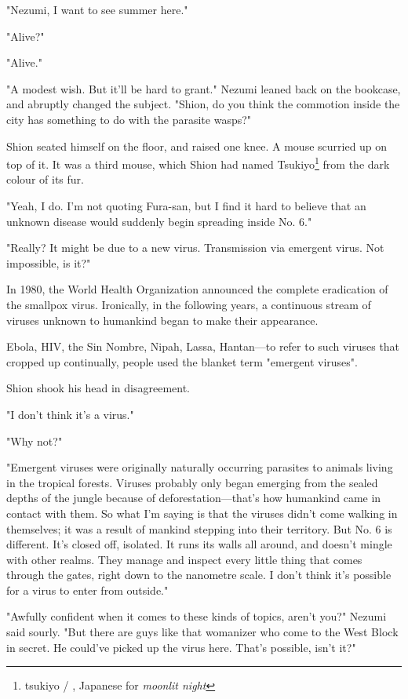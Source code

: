 "Nezumi, I want to see summer here."

"Alive?"

"Alive."

"A modest wish. But it'll be hard to grant." Nezumi leaned back on the
bookcase, and abruptly changed the subject. "Shion, do you think the
commotion inside the city has something to do with the parasite wasps?"

Shion seated himself on the floor, and raised one knee. A mouse scurried
up on top of it. It was a third mouse, which Shion had named Tsukiyo\footnote{tsukiyo / , Japanese for \emph{moonlit night}}
from the dark colour of its fur.

"Yeah, I do. I'm not quoting Fura-san, but I find it hard to believe
that an unknown disease would suddenly begin spreading inside No. 6."

"Really? It might be due to a new virus. Transmission via emergent
virus. Not impossible, is it?"

In 1980, the World Health Organization announced the complete
eradication of the smallpox virus. Ironically, in the following years, a
continuous stream of viruses unknown to humankind began to make their
appearance.

Ebola, HIV, the Sin Nombre, Nipah, Lassa, Hantan---to refer to such
viruses that cropped up continually, people used the blanket term
"emergent viruses".

Shion shook his head in disagreement.

"I don't think it's a virus."

"Why not?"

"Emergent viruses were originally naturally occurring parasites to
animals living in the tropical forests. Viruses probably only began
emerging from the sealed depths of the jungle because of
deforestation---that's how humankind came in contact with them. So what
I'm saying is that the viruses didn't come walking in themselves; it was
a result of mankind stepping into their territory. But No. 6 is
different. It's closed off, isolated. It runs its walls all around, and
doesn't mingle with other realms. They manage and inspect every little
thing that comes through the gates, right down to the nanometre scale. I
don't think it's possible for a virus to enter from outside."

"Awfully confident when it comes to these kinds of topics, aren't you?"
Nezumi said sourly. "But there are guys like that womanizer who come to
the West Block in secret. He could've picked up the virus here. That's
possible, isn't it?"


